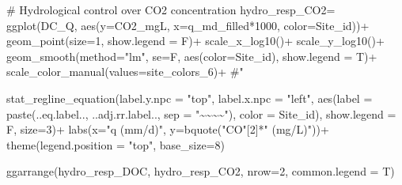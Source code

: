 \documentclass[
  letterpaper,
  DIV=11,
  numbers=noendperiod]{scrartcl}
\newenvironment{Shaded}{\begin{snugshade}}{\end{snugshade}}
\newcommand{\AttributeTok}[1]{\textcolor[rgb]{0.40,0.45,0.13}{#1}}
\newcommand{\CommentTok}[1]{\textcolor[rgb]{0.37,0.37,0.37}{#1}}
\newcommand{\DecValTok}[1]{\textcolor[rgb]{0.68,0.00,0.00}{#1}}
\newcommand{\FunctionTok}[1]{\textcolor[rgb]{0.28,0.35,0.67}{#1}}
\newcommand{\NormalTok}[1]{\textcolor[rgb]{0.00,0.23,0.31}{#1}}
\newcommand{\OtherTok}[1]{\textcolor[rgb]{0.00,0.23,0.31}{#1}}
\newcommand{\SpecialCharTok}[1]{\textcolor[rgb]{0.37,0.37,0.37}{#1}}
\newcommand{\StringTok}[1]{\textcolor[rgb]{0.13,0.47,0.30}{#1}}
\begin{document}
\begin{Shaded}
\begin{Highlighting}[]
\CommentTok{\# Hydrological control over CO2 concentration}
\NormalTok{hydro\_resp\_CO2}\OtherTok{=}
  \FunctionTok{ggplot}\NormalTok{(DC\_Q,}
       \FunctionTok{aes}\NormalTok{(}\AttributeTok{y=}\NormalTok{CO2\_mgL, }\AttributeTok{x=}\NormalTok{q\_md\_filled}\SpecialCharTok{*}\DecValTok{1000}\NormalTok{, }\AttributeTok{color=}\NormalTok{Site\_id))}\SpecialCharTok{+} 
  \FunctionTok{geom\_point}\NormalTok{(}\AttributeTok{size=}\DecValTok{1}\NormalTok{, }\AttributeTok{show.legend =}\NormalTok{ F)}\SpecialCharTok{+}
  \FunctionTok{scale\_x\_log10}\NormalTok{()}\SpecialCharTok{+}
  \FunctionTok{scale\_y\_log10}\NormalTok{()}\SpecialCharTok{+}
  \FunctionTok{geom\_smooth}\NormalTok{(}\AttributeTok{method=}\StringTok{"lm"}\NormalTok{, }\AttributeTok{se=}\NormalTok{F, }\FunctionTok{aes}\NormalTok{(}\AttributeTok{color=}\NormalTok{Site\_id), }\AttributeTok{show.legend =}\NormalTok{ T)}\SpecialCharTok{+}
  \FunctionTok{scale\_color\_manual}\NormalTok{(}\AttributeTok{values=}\NormalTok{site\_colors\_6)}\SpecialCharTok{+} \CommentTok{\#"}
  
  \FunctionTok{stat\_regline\_equation}\NormalTok{(}\AttributeTok{label.y.npc =} \StringTok{"top"}\NormalTok{, }\AttributeTok{label.x.npc =} \StringTok{"left"}\NormalTok{,}
  \FunctionTok{aes}\NormalTok{(}\AttributeTok{label =}  \FunctionTok{paste}\NormalTok{(..eq.label.., ..adj.rr.label.., }
                     \AttributeTok{sep =} \StringTok{"\textasciitilde{}\textasciitilde{}\textasciitilde{}\textasciitilde{}"}\NormalTok{), }\AttributeTok{color =}\NormalTok{ Site\_id), }
                      \AttributeTok{show.legend =}\NormalTok{ F, }\AttributeTok{size=}\DecValTok{3}\NormalTok{)}\SpecialCharTok{+}
  \FunctionTok{labs}\NormalTok{(}\AttributeTok{x=}\StringTok{"q (mm/d)"}\NormalTok{, }
       \AttributeTok{y=}\FunctionTok{bquote}\NormalTok{(}\StringTok{"CO"}\NormalTok{[}\DecValTok{2}\NormalTok{]}\SpecialCharTok{*}\StringTok{" (mg/L)"}\NormalTok{))}\SpecialCharTok{+}
  \FunctionTok{theme}\NormalTok{(}\AttributeTok{legend.position =} \StringTok{"top"}\NormalTok{, }\AttributeTok{base\_size=}\DecValTok{8}\NormalTok{)}



\FunctionTok{ggarrange}\NormalTok{(hydro\_resp\_DOC, }
\NormalTok{          hydro\_resp\_CO2, }
          \AttributeTok{nrow=}\DecValTok{2}\NormalTok{, }\AttributeTok{common.legend =}\NormalTok{ T)}
\end{Highlighting}
\end{Shaded}
\end{document}
